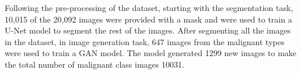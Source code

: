 \documentclass[12pt]{diazessay}
\begin{document}
   \hspace{0.2cm} Following the pre-processing of the dataset, starting with the segmentation task, 10,015 of the 20,092 images were provided with a mask and were used to train a U-Net model to segment the rest of the images. After segmenting all the images in the dataset, in image generation task, 647 images from the malignant types were used to train a GAN model. The model generated 1299 new images to make the total number of malignant class images 10031. 
   
   
   
\end{document}
